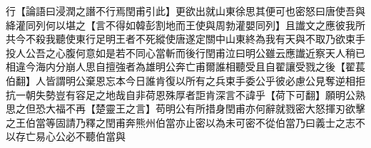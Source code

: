 行【論語曰浸潤之譖不行焉閏甫引此】更欲出就山東徐思其便可也密怒曰唐使吾與絳灌同列何以堪之【言不得如韓彭割地而王使與周勃灌嬰同列】且䜟文之應彼我所共今不殺我聽使東行足明王者不死縱使唐遂定關中山東終為我有天與不取乃欲束手投人公吾之心腹何意如是若不同心當斬而後行閏甫泣曰明公雖云應䜟近察天人稍已相違今海内分崩人思自擅強者為雄明公奔亡甫爾誰相聽受且自翟讓受戮之後【翟萇伯翻】人皆謂明公棄恩忘本今日誰肯復以所有之兵束手委公乎彼必慮公見奪逆相拒抗一朝失勢豈有容足之地哉自非荷恩殊厚者詎肯深言不諱乎【荷下可翻】願明公熟思之但恐大福不再【楚靈王之言】苟明公有所措身閏甫亦何辭就戮密大怒揮刃欲擊之王伯當等固請乃釋之閏甫奔熊州伯當亦止密以為未可密不從伯當乃曰義士之志不以存亡易心公必不聽伯當與